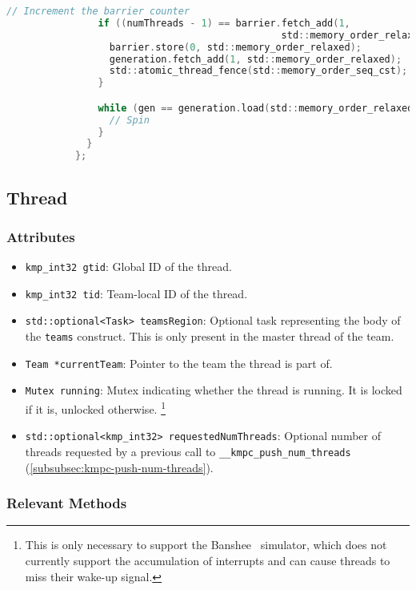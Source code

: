 \begin{itemize}
\begin{lstlisting}[language=C, caption={Barrier::wait}, label={lst:barrier-wait},
          escapechar=@]
                // Increment the barrier counter
                if ((numThreads - 1) == barrier.fetch_add(1,
                                                std::memory_order_relaxed)) {
                  barrier.store(0, std::memory_order_relaxed);
                  generation.fetch_add(1, std::memory_order_relaxed);
                  std::atomic_thread_fence(std::memory_order_seq_cst);
                }

                while (gen == generation.load(std::memory_order_relaxed)) {
                  // Spin
                }
              }
            };
          \end{lstlisting}
\end{itemize}

\subsection{Thread}
\label{subsec:thread}

\subsubsection{Attributes}

\begin{itemize}
	\item \texttt{kmp_int32 gtid}: Global ID of the thread.
	\item \texttt{kmp_int32 tid}: Team-local ID of the thread.
	\item \texttt{std::optional<Task> teamsRegion}: Optional task representing the body of the
	      \texttt{teams} construct. This is only present in the master thread of the team.
	\item \texttt{Team *currentTeam}: Pointer to the team the thread is part of.
	\item \texttt{Mutex running}: Mutex indicating whether the thread is running. It is locked if it
	      is, unlocked otherwise. \footnote{This is only necessary to support the
		      Banshee~\cite{banshee} simulator, which does not currently support the accumulation of
		      interrupts and can cause threads to miss their wake-up signal.}
	\item \texttt{std::optional<kmp_int32> requestedNumThreads}: Optional number of threads requested
	      by a previous call to \texttt{__kmpc_push_num_threads} (\cref{subsubsec:kmpc-push-num-threads}).
\end{itemize}

\subsubsection{Relevant Methods}


